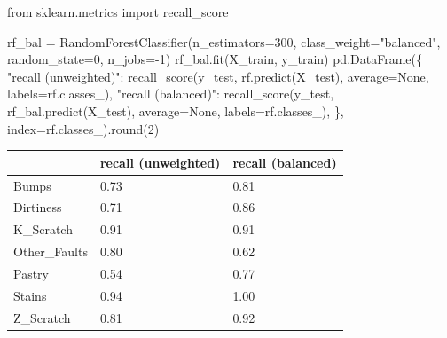 \documentclass[
  letterpaper,
  DIV=11,
  numbers=noendperiod]{scrreprt}
\newenvironment{Shaded}{\begin{snugshade}}{\end{snugshade}}
\newcommand{\BuiltInTok}[1]{\textcolor[rgb]{0.00,0.23,0.31}{#1}}
\newcommand{\DecValTok}[1]{\textcolor[rgb]{0.68,0.00,0.00}{#1}}
\newcommand{\ImportTok}[1]{\textcolor[rgb]{0.00,0.46,0.62}{#1}}
\newcommand{\NormalTok}[1]{\textcolor[rgb]{0.00,0.23,0.31}{#1}}
\newcommand{\OperatorTok}[1]{\textcolor[rgb]{0.37,0.37,0.37}{#1}}
\newcommand{\StringTok}[1]{\textcolor[rgb]{0.13,0.47,0.30}{#1}}
\newcommand{\VariableTok}[1]{\textcolor[rgb]{0.07,0.07,0.07}{#1}}
\begin{document}
\begin{tcolorbox}[enhanced jigsaw, left=2mm, title=\textcolor{quarto-callout-caution-color}{\faFire}\hspace{0.5em}{Solution to Exercise 4}, opacityback=0, breakable, rightrule=.15mm, arc=.35mm, toptitle=1mm, colbacktitle=quarto-callout-caution-color!10!white, opacitybacktitle=0.6, coltitle=black, colframe=quarto-callout-caution-color-frame, bottomrule=.15mm, leftrule=.75mm, bottomtitle=1mm, titlerule=0mm, toprule=.15mm, colback=white]

\begin{Shaded}
\begin{Highlighting}[]
\ImportTok{from}\NormalTok{ sklearn.metrics }\ImportTok{import}\NormalTok{ recall\_score}

\NormalTok{rf\_bal }\OperatorTok{=}\NormalTok{ RandomForestClassifier(n\_estimators}\OperatorTok{=}\DecValTok{300}\NormalTok{, class\_weight}\OperatorTok{=}\StringTok{"balanced"}\NormalTok{, random\_state}\OperatorTok{=}\DecValTok{0}\NormalTok{, n\_jobs}\OperatorTok{={-}}\DecValTok{1}\NormalTok{)}
\NormalTok{rf\_bal.fit(X\_train, y\_train)}
\NormalTok{pd.DataFrame(\{}
    \StringTok{"recall (unweighted)"}\NormalTok{: recall\_score(y\_test, rf.predict(X\_test), average}\OperatorTok{=}\VariableTok{None}\NormalTok{, labels}\OperatorTok{=}\NormalTok{rf.classes\_),}
    \StringTok{"recall (balanced)"}\NormalTok{: recall\_score(y\_test, rf\_bal.predict(X\_test), average}\OperatorTok{=}\VariableTok{None}\NormalTok{, labels}\OperatorTok{=}\NormalTok{rf.classes\_),}
\NormalTok{\}, index}\OperatorTok{=}\NormalTok{rf.classes\_).}\BuiltInTok{round}\NormalTok{(}\DecValTok{2}\NormalTok{)}
\end{Highlighting}
\end{Shaded}

\begin{longtable}[]{@{}lll@{}}
\toprule\noalign{}
& recall (unweighted) & recall (balanced) \\
\midrule\noalign{}
\endhead
\bottomrule\noalign{}
\endlastfoot
Bumps & 0.73 & 0.81 \\
Dirtiness & 0.71 & 0.86 \\
K\_Scratch & 0.91 & 0.91 \\
Other\_Faults & 0.80 & 0.62 \\
Pastry & 0.54 & 0.77 \\
Stains & 0.94 & 1.00 \\
Z\_Scratch & 0.81 & 0.92 \\
\end{longtable}


\end{tcolorbox}
\end{document}
